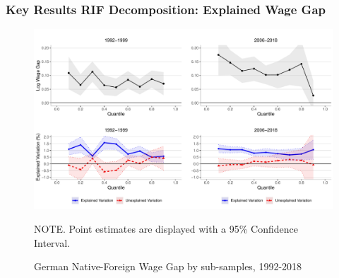 \documentclass[10pt]{beamer}
\begin{document}
\begin{frame}
	\frametitle{Key Results RIF Decomposition: Explained Wage Gap}
	
	
	\begin{figure}[H]
		\begin{minipage}{0.95\textwidth} %
			\includegraphics[scale=0.4]{nfgap_t} \\
			{\footnotesize \tiny NOTE. \textemdash Point estimates are displayed with a 95\% Confidence Interval. \par}
			\caption{\centering German Native-Foreign Wage Gap by sub-samples, 1992-2018 \label{fig:wgap_indiv_occ}}
		\end{minipage}
	\end{figure}
	
	
	
\end{frame}


\end{document}
